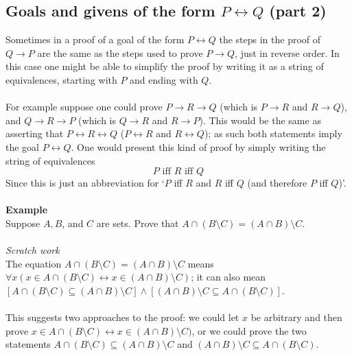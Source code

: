 \documentclass{report}
\theoremstyle{definition}
\begin{document}
\subsection{Goals and givens of the form $P\leftrightarrow Q$ (part 2)}
Sometimes in a proof of a goal of the form $P\leftrightarrow Q$ the steps in the proof of $Q\to P$ are the same as 
the steps used to prove $P\to Q$, just in reverse order.
In this case one might be able to simplify the proof by writing it as a string of equivalences, starting with $P$ and ending
with $Q$.\\
\vspace{1mm}\\
For example suppose one could prove $P\to R\to Q$ (which is $P\to R$ and $R\to Q$), and $Q\to R\to P$ 
(which is $Q\to R$ and $R\to P$). This would be the same as asserting that 
$P\leftrightarrow R\leftrightarrow Q$ ($P\leftrightarrow R$ and $R\leftrightarrow Q$); as such both statements imply 
the goal $P\leftrightarrow Q$. One would present this kind
of proof by simply writing the string of equivalences
\begin{equation*}
P\text{ iff }R\text{ iff }Q
\end{equation*}
Since this is just an abbreviation for `$P$ iff $R$ and $R$ iff $Q$ (and therefore $P$ iff $Q$)'.\\
\vspace{1mm}\\
\textbf{Example}\\
Suppose $A,B$, and $C$ are sets. Prove that $A\cap(B\setminus C)=(A\cap B)\setminus C$.\\
\vspace{1mm}\\
\textit{Scratch work}\\
The equation $A\cap(B\setminus C)=(A\cap B)\setminus C$ means $\forall x(x\in A\cap(B\setminus C)\leftrightarrow x\in(A\cap B)\setminus C)$; it can also mean 
$[A\cap(B\setminus C)\subseteq(A\cap B)\setminus C]\land[(A\cap B)\setminus C\subseteq A\cap(B\setminus C)]$.\\
\vspace{1mm}\\
This suggests two approaches to the proof: we could let $x$ be arbitrary and then prove $x\in A\cap(B\setminus C)\leftrightarrow x\in(A\cap B)\setminus C)$, or we could prove the two statements
$A\cap(B\setminus C)\subseteq(A\cap B)\setminus C$ and $(A\cap B)\setminus C\subseteq A\cap(B\setminus C)$.\\
\vspace{1mm}\\
\end{document}
